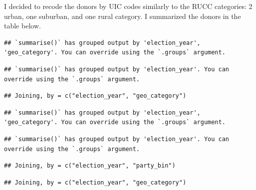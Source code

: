 \documentclass[10pt,]{article}
\begin{document}
I decided to recode the donors by UIC codes similarly to the RUCC
categories: 2 urban, one suburban, and one rural category. I summarized
the donors in the table below.

\begin{verbatim}
## `summarise()` has grouped output by 'election_year', 'geo_category'. You can override using the `.groups` argument.
\end{verbatim}

\begin{verbatim}
## `summarise()` has grouped output by 'election_year'. You can override using the `.groups` argument.
\end{verbatim}

\begin{verbatim}
## Joining, by = c("election_year", "geo_category")
\end{verbatim}

\begin{verbatim}
## `summarise()` has grouped output by 'election_year', 'geo_category'. You can override using the `.groups` argument.
\end{verbatim}

\begin{verbatim}
## `summarise()` has grouped output by 'election_year'. You can override using the `.groups` argument.
\end{verbatim}

\begin{verbatim}
## Joining, by = c("election_year", "party_bin")
\end{verbatim}

\begin{verbatim}
## Joining, by = c("election_year", "geo_category")
\end{verbatim}
\end{document}
